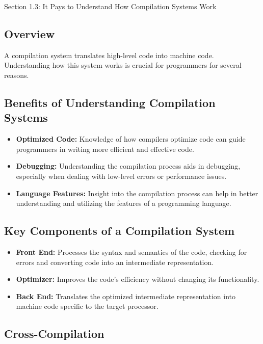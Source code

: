 \begin{notes}{Section 1.3: It Pays to Understand How Compilation Systems Work}
    \subsection*{Overview}

    A compilation system translates high-level code into machine code. Understanding how this system works is crucial for programmers for several reasons. \vspace*{1em}
    
    \subsection*{Benefits of Understanding Compilation Systems}

    \begin{itemize}
        \item \textbf{Optimized Code:} Knowledge of how compilers optimize code can guide programmers in writing more efficient and effective code.
        \item \textbf{Debugging:} Understanding the compilation process aids in debugging, especially when dealing with low-level errors or performance issues.
        \item \textbf{Language Features:} Insight into the compilation process can help in better understanding and utilizing the features of a programming language.
    \end{itemize}
    
    \subsection*{Key Components of a Compilation System}

    \begin{itemize}
        \item \textbf{Front End:} Processes the syntax and semantics of the code, checking for errors and converting code into an intermediate representation.
        \item \textbf{Optimizer:} Improves the code's efficiency without changing its functionality.
        \item \textbf{Back End:} Translates the optimized intermediate representation into machine code specific to the target processor.
    \end{itemize}
    
    \subsection*{Cross-Compilation}


\end{notes}
